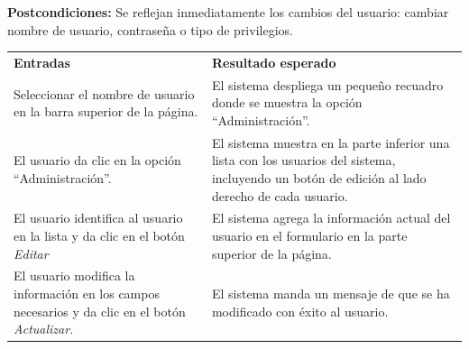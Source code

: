 \documentclass[10pt,letterpaper]{article}
\begin{document}
\textbf{Postcondiciones:} Se reflejan inmediatamente los cambios del usuario: cambiar nombre de usuario, contraseña o tipo de privilegios.


\begin{adjustwidth}{-6em}{-6em}
	\begin{center}
		\begin{tabularx}{1.2\textwidth}{ | X | X | }
			\hline
			\rowcolor{NewBlue} \multicolumn{2}{|c|}{\textbf{Casos de prueba (Flujo normal)}} \\
			\hline
			\textbf{Entradas}	&	\textbf{Resultado esperado} \\
			\hline
			Seleccionar el nombre de usuario en la barra superior de la página.&
			El sistema despliega un pequeño recuadro donde se muestra la opción ``Administración''.\\
			\hline
			El usuario da clic en la opción ``Administración''.&
			El sistema muestra en la parte inferior una lista con los usuarios del sistema, incluyendo un botón de edición al lado derecho de cada usuario. \\
			\hline
			El usuario identifica al usuario en la lista y da clic en el botón \textit{Editar}&
			El sistema agrega la información actual del usuario en el formulario en la parte superior de la página. \\
			\hline
			El usuario modifica la información en los campos necesarios y da clic en el botón \textit{Actualizar}.&
			El sistema manda un mensaje de que se ha modificado con éxito al usuario.\\
			\hline
		\end{tabularx}
	\end{center}
\end{adjustwidth}

			
\end{document}
